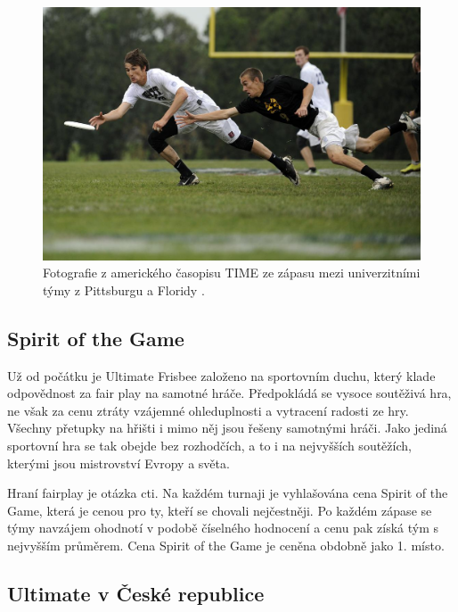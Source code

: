 \begin{figure}[ht!]
\centering
\includegraphics[width=130mm]{./images/ultimate-frisbee.jpg}
\caption{Fotografie z amerického časopisu TIME ze zápasu mezi univerzitními týmy z Pittsburgu a Floridy \cite{ultimate-time}.\label{overflow}}
\end{figure}


\subsection{Spirit of the Game}

\indent

Už od počátku je Ultimate Frisbee založeno na sportovním duchu, který klade odpovědnost
za fair play na samotné hráče. Předpokládá se vysoce soutěživá hra, ne však za cenu ztráty
vzájemné ohleduplnosti a vytracení radosti ze hry. Všechny přetupky na hřišti i mimo něj jsou
řešeny samotnými hráči. Jako jediná sportovní hra se tak obejde bez rozhodčích, a to i
na nejvyšších soutěžích, kterými jsou mistrovství Evropy a světa.

\medskip

Hraní fairplay je otázka cti. Na každém turnaji je vyhlašována cena Spirit of the Game,
která je cenou pro ty, kteří se chovali nejčestněji. Po každém zápase se týmy navzájem ohodnotí
v podobě číselného hodnocení a cenu pak získá tým s nejvyšším průměrem. Cena Spirit of the Game
je ceněna obdobně jako 1. místo.

\subsection{Ultimate v České republice}

\indent

